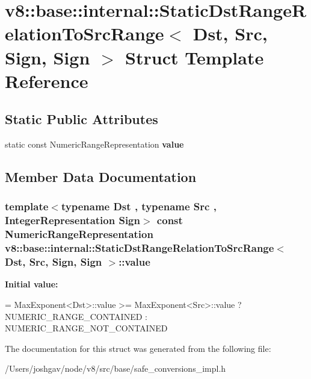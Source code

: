 \hypertarget{structv8_1_1base_1_1internal_1_1_static_dst_range_relation_to_src_range_3_01_dst_00_01_src_00_01_sign_00_01_sign_01_4}{}\section{v8\+:\+:base\+:\+:internal\+:\+:Static\+Dst\+Range\+Relation\+To\+Src\+Range$<$ Dst, Src, Sign, Sign $>$ Struct Template Reference}
\label{structv8_1_1base_1_1internal_1_1_static_dst_range_relation_to_src_range_3_01_dst_00_01_src_00_01_sign_00_01_sign_01_4}
\subsection*{Static Public Attributes}
\begin{DoxyCompactItemize}
\item 
static const Numeric\+Range\+Representation {\bfseries value}
\end{DoxyCompactItemize}


\subsection{Member Data Documentation}
\subsubsection[{\texorpdfstring{value}{value}}]{\setlength{\rightskip}{0pt plus 5cm}template$<$typename Dst , typename Src , Integer\+Representation Sign$>$ const Numeric\+Range\+Representation {\bf v8\+::base\+::internal\+::\+Static\+Dst\+Range\+Relation\+To\+Src\+Range}$<$ Dst, Src, Sign, Sign $>$\+::value\hspace{0.3cm}{\ttfamily [static]}}\hypertarget{structv8_1_1base_1_1internal_1_1_static_dst_range_relation_to_src_range_3_01_dst_00_01_src_00_01_sign_00_01_sign_01_4_a900026fdb73350908f464603105100b4}{}\label{structv8_1_1base_1_1internal_1_1_static_dst_range_relation_to_src_range_3_01_dst_00_01_src_00_01_sign_00_01_sign_01_4_a900026fdb73350908f464603105100b4}
{\bfseries Initial value\+:}
\begin{DoxyCode}
=
      MaxExponent<Dst>::value >= MaxExponent<Src>::value
          ? NUMERIC\_RANGE\_CONTAINED
          : NUMERIC\_RANGE\_NOT\_CONTAINED
\end{DoxyCode}


The documentation for this struct was generated from the following file\+:\begin{DoxyCompactItemize}
\item 
/\+Users/joshgav/node/v8/src/base/safe\+\_\+conversions\+\_\+impl.\+h\end{DoxyCompactItemize}
